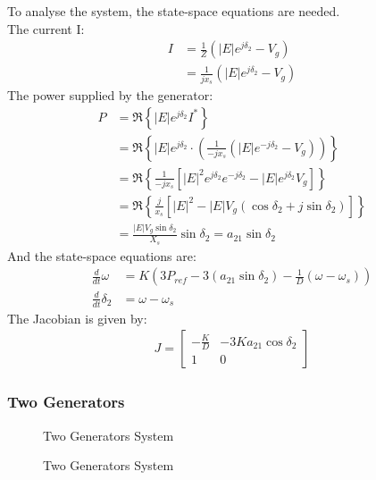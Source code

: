\documentclass[12pt,English]{article}
\begin{document}
To analyse the system, the state-space equations are needed.\\
The current I:
\begin{align*}
I &= \frac{1}{Z}\left(\left|E\right|e^{j\delta_2}-V_g\right)\\
&= \frac{1}{jx_s}\left(\left|E\right|e^{j\delta_2}-V_g\right)
\end{align*}
The power supplied by the generator:
\begin{align*}
P &= \Re\left\{\left|E\right|e^{j\delta_2}I^*\right\}\\
&= \Re\left\{\left|E\right|e^{j\delta_2}\cdot\left(\frac{1}{-jx_s}\left(\left|E\right|e^{-j\delta_2}-V_g\right)\right)\right\}\\
&= \Re\left\{\frac{1}{-jx_s}\left[\left|E\right|^{2}e^{j\delta_2}e^{-j\delta_2}-\left|E\right|e^{j\delta_2}V_g\right]\right\}\\
&=  \Re\left\{\frac{j}{x_s}\left[\left|E\right|^{2}-\left|E\right|V_g\left(\cos{\delta_2}+j\sin{\delta_2}\right)\right]\right\}\\
&= \frac{\left|E\right|V_g\sin{\delta_2}}{X_s}\sin{\delta_2}=a_{21}\sin{\delta_2}
\end{align*}
And the state-space equations are:
\begin{align*}
\frac{d}{dt}\omega&=K\left(3P_{ref}-3\left(a_{21}\sin{\delta_2}\right)-\frac{1}{D}\left(\omega-\omega_{s}\right)\right)\\
\frac{d}{dt}\delta_2&=\omega-\omega_s   
\end{align*}
The Jacobian is given by:
\begin{align}\label{one_gen_J}
J=\left[\begin{array}{cc}
-\frac{K}{D} & -3Ka_{21}\cos{\delta_2}\\
1 & 0
\end{array}\right]    
\end{align}


\subsubsection{Two Generators}

\begin{figure}[H]
\begin{center}

\end{center}
\caption{Two Generators System}
\end{figure}

\begin{figure}[H]
\begin{center}

\end{center}
\caption{Two Generators System}
\end{figure}
\end{document}
